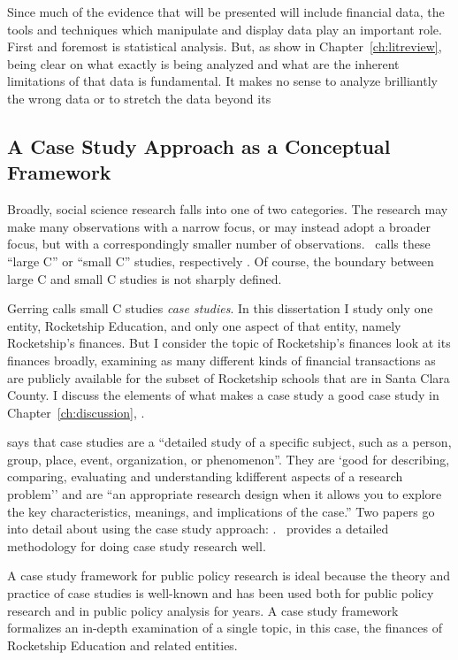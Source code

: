 Since much of the evidence that will be presented will include financial data, the tools and techniques which manipulate and display data play an important role. First and foremost is statistical analysis. But, as \textcite{Epple.etal2016} show in Chapter~\ref{ch:litreview}, being clear on what exactly is being analyzed and what are the inherent limitations of that data is fundamental. It makes no sense to analyze brilliantly the wrong data or to stretch the data beyond its 
\subsection{A Case Study Approach as a Conceptual Framework}\indent

Broadly, social science research falls into one of two categories. The research may make many observations with a narrow focus, or may instead adopt a broader focus, but with a correspondingly smaller number of observations.  \citeauthor{Gerring2017} calls these ``large C'' or ``small C'' studies, respectively \parencite[xvii]{Gerring2017}. Of course, the boundary between large C and small C studies is not sharply defined.

Gerring calls small C studies \textit{case studies}. In this dissertation I study only one entity, Rocketship Education, and only one aspect of that entity, namely Rocketship's finances. But I consider the topic of  Rocketship's finances look at its finances broadly, examining as many different kinds of financial transactions as are publicly available for the subset of Rocketship schools that are in Santa Clara County. I discuss the elements of what makes a case study a good case study in Chapter~\ref{ch:discussion}, \textit{{}}.

\textcite{McCombes2019} says that case studies are a ``detailed study of a specific subject, such as a person, group, place, event, organization, or phenomenon''. They are `good for describing, comparing, evaluating and understanding kdifferent aspects of a research problem'' and are ``an appropriate research design when it allows you to explore the key characteristics, meanings, and implications of the case.'' Two papers go into detail about using the case study approach: \textcite{Crowe.etal2011,Rashid.etal2019}. \textcite{Yin2018} provides a detailed methodology for doing case study research well. %

A case study framework for public policy research is ideal because the theory and practice of case studies is well-known and has been used both for public policy research and in  public policy analysis for years. A case study framework formalizes an in-depth examination of a single topic, in this case, the finances of Rocketship Education and related entities.

